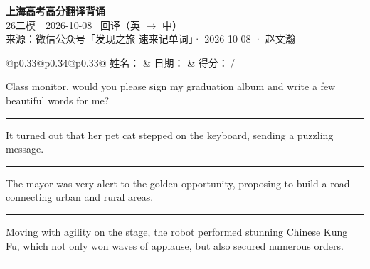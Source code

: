 \documentclass[11pt,a4paper]{article}
\newcommand{\num}[1]{\makebox[1.9em][r]{#1.}\hspace{0.3em}}
\newcommand{\wline}{\noindent\rule{\linewidth}{0.4pt}}
\begin{document}
\pagestyle{plain}
\begin{center}
{\LARGE\bfseries 上海高考高分翻译背诵 }\\[0.25em]
{\large 26二模　2026-10-08 \quad\ 回译（英 $\to$ 中）}\\[0.35em]
{\footnotesize 来源：微信公众号「发现之旅 速来记单词」· 2026-10-08 · 赵文瀚}
\end{center}

\vspace{0.4em}
\noindent\begin{tabular}{@{}p{0.33\textwidth}@{}p{0.34\textwidth}@{}p{0.33\textwidth}@{}}
姓名：\underline{\hspace{2.0cm}} & 日期：\underline{\hspace{2.0cm}} & 得分：\underline{\hspace{1.4cm}}\,/ \\
\end{tabular}

\vspace{0.5em}

\vspace{0.8em}
\num{1}Class monitor, would you please sign my graduation album and write a few beautiful words for me?

\vspace{0.25em}

\wline

\num{2}It turned out that her pet cat stepped on the keyboard, sending a puzzling message.

\vspace{0.25em}

\wline

\num{3}The mayor was very alert to the golden opportunity, proposing to build a road connecting urban and rural areas.

\vspace{0.25em}

\wline

\num{4}Moving with agility on the stage, the robot performed stunning Chinese Kung Fu, which not only won waves of applause, but also secured numerous orders.

\vspace{0.25em}

\wline
\end{document}

